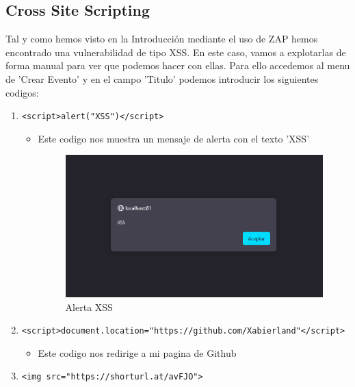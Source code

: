 \documentclass{report}
\begin{document}
            \subsection{Cross Site Scripting}
                Tal y como hemos visto en la Introducción mediante el uso de ZAP hemos encontrado una vulnerabilidad de tipo XSS.
                En este caso, vamos a explotarlas de forma manual para ver que podemos hacer con ellas.
                Para ello accedemos al menu de 'Crear Evento' y en el campo 'Titulo' podemos introducir los siguientes codigos:
                \begin{enumerate}
                    \item \texttt{<script>alert("XSS")</script>}
                    \begin{itemize}
                        \item Este codigo nos muestra un mensaje de alerta con el texto 'XSS'
                        \begin{figure}[H]
                            \centering
                            \includegraphics[width=1\textwidth]{./img/vulnerabilidades/2.3/2.1.png}
                            \caption{Alerta XSS}
                        \end{figure}
                    \end{itemize}
                    \item \texttt{<script>document.location="https://github.com/Xabierland"</script>}
                    \begin{itemize}
                        \item Este codigo nos redirige a mi pagina de Github
                    \end{itemize}
                    \item \texttt{<img src="https://shorturl.at/avFJO">}

\end{enumerate}
\end{document}
